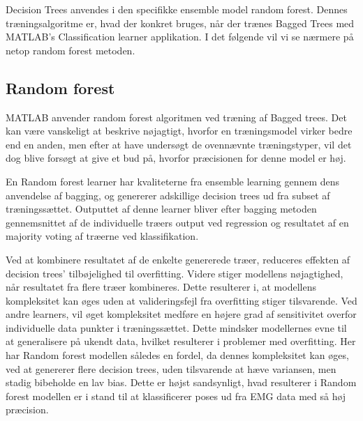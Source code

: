 Decision Trees anvendes i den specifikke ensemble model random forest. Dennes træningsalgoritme er, hvad der konkret bruges, når der trænes Bagged Trees med MATLAB’s Classification learner applikation. I det følgende vil vi se nærmere på netop random forest metoden.

\subsection{Random forest}
MATLAB anvender random forest algoritmen ved træning af Bagged trees. Det kan være vanskeligt at beskrive nøjagtigt, hvorfor en træningsmodel virker bedre end en anden, men efter at have undersøgt de ovennævnte træningstyper, vil det dog blive forsøgt at give et bud på, hvorfor præcisionen for denne model er høj.%

En Random forest learner har kvaliteterne fra ensemble learning gennem dens anvendelse af bagging, og genererer adskillige decision trees ud fra subset af træningssættet. Outputtet af denne learner bliver efter bagging metoden gennemsnittet af de individuelle træers output ved regression og resultatet af en majority voting af træerne ved klassifikation.%


Ved at kombinere resultatet af de enkelte genererede træer, reduceres effekten af decision trees' tilbøjelighed til overfitting. Videre stiger modellens nøjagtighed, når resultatet fra flere træer kombineres. Dette resulterer i, at modellens kompleksitet kan øges uden at valideringsfejl fra overfitting stiger tilsvarende. 
Ved andre learners, vil øget kompleksitet medføre en højere grad af sensitivitet overfor individuelle data punkter i træningssættet. Dette mindsker modellernes evne til at generalisere på ukendt data, hvilket resulterer i problemer med overfitting. Her har Random forest modellen således en fordel, da dennes kompleksitet kan øges, ved at genererer flere decision trees, uden tilsvarende at hæve variansen, men stadig bibeholde en lav bias. %
Dette er højst sandsynligt, hvad resulterer i Random forest modellen er i stand til at klassificerer poses ud fra EMG data med så høj præcision.   


